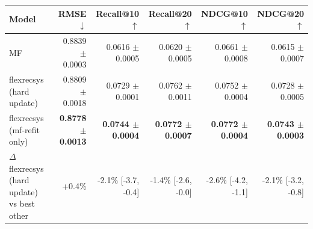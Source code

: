 \begin{tabular}{lrrrrr}
\toprule
Model & RMSE $\downarrow$ & Recall@10 $\uparrow$ & Recall@20 $\uparrow$ & NDCG@10 $\uparrow$ & NDCG@20 $\uparrow$ \\
\midrule
MF & 0.8839 $\pm$ 0.0003 & 0.0616 $\pm$ 0.0005 & 0.0620 $\pm$ 0.0005 & 0.0661 $\pm$ 0.0008 & 0.0615 $\pm$ 0.0007 \\
flexrecsys (hard update) & 0.8809 $\pm$ 0.0018 & 0.0729 $\pm$ 0.0001 & 0.0762 $\pm$ 0.0011 & 0.0752 $\pm$ 0.0004 & 0.0728 $\pm$ 0.0005 \\
flexrecsys (mf-refit only) & \textbf{0.8778 $\pm$ 0.0013} & \textbf{0.0744 $\pm$ 0.0004} & \textbf{0.0772 $\pm$ 0.0007} & \textbf{0.0772 $\pm$ 0.0004} & \textbf{0.0743 $\pm$ 0.0003} \\
\midrule
$\Delta$ flexrecsys (hard update) vs best other & +0.4\% & -2.1\% [-3.7, -0.4] & -1.4\% [-2.6, -0.0] & -2.6\% [-4.2, -1.1] & -2.1\% [-3.2, -0.8] \\
\bottomrule
\end{tabular}
